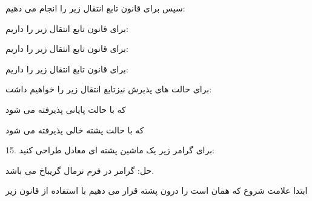 \documentclass[]{article}
\begin{document}
\begin{center}
\end{center}

سپس برای قانون  تابع انتقال زیر را انجام می دهیم:

\begin{center}
\end{center}

برای قانون  تابع انتقال زیر را داریم:

\begin{center}
\end{center}

برای قانون  تابع انتقال زیر را داریم:
\begin{center}
\end{center}

برای قانون  تابع انتقال زیر را داریم:
\begin{center}
\end{center}

برای حالت های پذیرش نیزتابع انتقال زیر را خواهیم داشت:
\begin{center}
\end{center}
که با حالت پایانی پذیرفته می شود

\begin{center}
\end{center}
که با حالت پشته خالی پذیرفته می شود



15. برای گرامر زیر یک ماشین پشته ای معادل طراحی کنید:
\begin{center}
\end{center}
\begin{center}
\end{center}

حل: گرامر در فرم نرمال گریباخ می باشد.

ابتدا علامت شروع که همان  است را درون پشته قرار می دهیم با استفاده از قانون زیر
\end{document}
